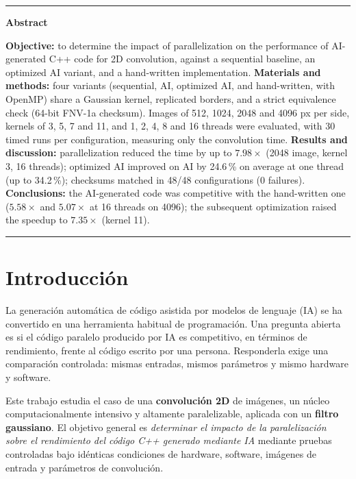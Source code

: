 \documentclass[12pt]{article}
\begin{document}
\vspace{10pt}
\hrule

\noindent\textbf{Abstract}
\vspace{2pt}

\noindent\textbf{Objective:} to determine the impact of parallelization on the
performance of AI-generated C++ code for 2D convolution, against a sequential
baseline, an optimized AI variant, and a hand-written implementation.
\textbf{Materials and methods:} four variants (sequential, AI, optimized AI, and
hand-written, with OpenMP) share a Gaussian kernel, replicated borders, and a
strict equivalence check (64-bit FNV-1a checksum). Images of 512, 1024, 2048 and
4096 px per side, kernels of 3, 5, 7 and 11, and 1, 2, 4, 8 and 16 threads were
evaluated, with 30 timed runs per configuration, measuring only the convolution
time.
\textbf{Results and discussion:} parallelization reduced the time by up to
$7.98\times$ (2048 image, kernel 3, 16 threads); optimized AI improved on AI by
24.6\,\% on average at one thread (up to 34.2\,\%); checksums matched in 48/48
configurations (0 failures).
\textbf{Conclusions:} the AI-generated code was competitive with the hand-written
one ($5.58\times$ and $5.07\times$ at 16 threads on 4096); the subsequent
optimization raised the speedup to $7.35\times$ (kernel 11).

\vspace{10pt}
\hrule

\section{Introducción}
\label{sec:intro}

La generación automática de código asistida por modelos de lenguaje (IA) se ha
convertido en una herramienta habitual de programación. Una pregunta abierta es
si el código paralelo producido por IA es competitivo, en términos de rendimiento,
frente al código escrito por una persona. Responderla exige una comparación
controlada: mismas entradas, mismos parámetros y mismo hardware y software.

Este trabajo estudia el caso de una \textbf{convolución 2D} de imágenes, un
núcleo computacionalmente intensivo y altamente paralelizable, aplicada con un
\textbf{filtro gaussiano}. El objetivo general es \emph{determinar el impacto de
la paralelización sobre el rendimiento del código C++ generado mediante IA}
mediante pruebas controladas bajo idénticas condiciones de hardware, software,
imágenes de entrada y parámetros de convolución.
\end{document}
